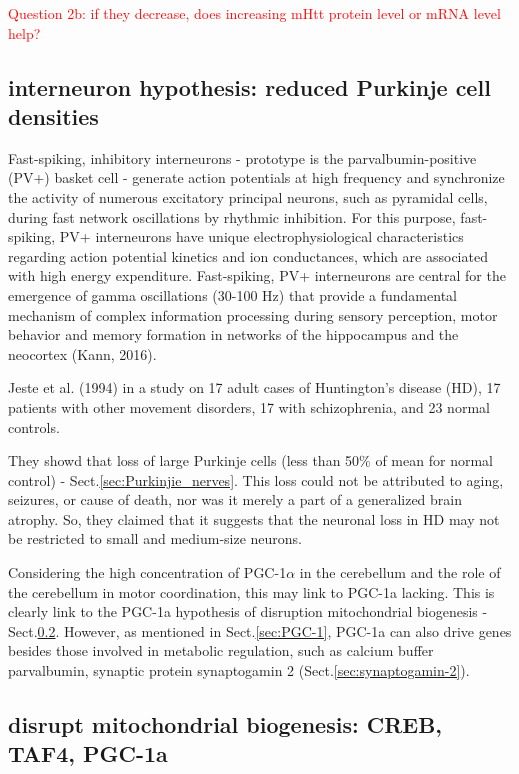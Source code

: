 \textcolor{red}{Question 2b: if they decrease, does increasing mHtt protein
level or mRNA level help?}




\subsection{interneuron hypothesis: reduced Purkinje cell densities}
\label{sec:HD-theory-cerebellar-Purkinje-cell}
\label{sec:HD-theory-interneuron}

Fast-spiking, inhibitory interneurons - prototype is the parvalbumin-positive
(PV+) basket cell - generate action potentials at high frequency and synchronize
the activity of numerous excitatory principal neurons, such as pyramidal cells,
during fast network oscillations by rhythmic inhibition. For this purpose,
fast-spiking, PV+ interneurons have unique electrophysiological characteristics
regarding action potential kinetics and ion conductances, which are associated
with high energy expenditure. Fast-spiking, PV+ interneurons are central for the
emergence of gamma oscillations (30-100 Hz) that provide a fundamental mechanism
of complex information processing during sensory perception, motor behavior and
memory formation in networks of the hippocampus and the neocortex (Kann, 2016).

Jeste et al. (1994) in a study on 17 adult cases of Huntington's disease (HD),
17 patients with other movement disorders, 17 with schizophrenia, and 23 normal
controls.

They showd that loss of large Purkinje cells (less than 50\% of mean for normal
control) - Sect.\ref{sec:Purkinjie_nerves}. This loss could not be attributed to
aging, seizures, or cause of death, nor was it merely a part of a generalized
brain atrophy. So, they claimed that it suggests that the neuronal loss in HD
may not be restricted to small and medium-size neurons.

Considering the high concentration of PGC-1$\alpha$ in the cerebellum and the
role of the cerebellum in motor coordination, this may link to PGC-1a lacking.
This is clearly link to the PGC-1a hypothesis of disruption mitochondrial
biogenesis - Sect.\ref{sec:HD-theory-PGC-1}. However, as mentioned in
Sect.\ref{sec:PGC-1}, PGC-1a  can also drive genes besides those involved in
metabolic regulation, such as calcium buffer parvalbumin, synaptic protein
synaptogamin 2 (Sect.\ref{sec:synaptogamin-2}).

\subsection{disrupt mitochondrial biogenesis: CREB, TAF4, PGC-1a}
\label{sec:HD-theory-PGC-1}
\label{sec:HD-theory-mitochondria}

